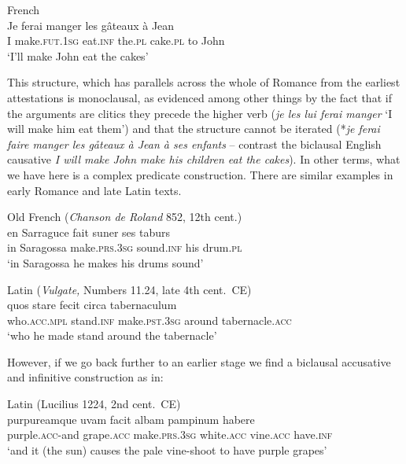 \documentclass[output=paper,hidelinks]{langscibook}
\begin{document}
\ea%
   \label{ex:RRG:44}French\\
   \gll Je   ferai       manger  les   gâteaux   à   Jean\\
      I   make.\textsc{fut.1sg}   eat.\textsc{inf}  the.\textsc{pl}  cake.\textsc{pl}   to   John\\
   \glt `I'll make John eat the cakes'
   \z


This structure, which has parallels across the whole of Romance from the earliest attestations \citep{Vincent2016} is monoclausal, as evidenced among other things by the fact that if the arguments are clitics they precede the higher verb (\textit{je les lui ferai manger} `I will make him eat them') and that the structure cannot be iterated (*\textit{je ferai faire manger les gåteaux à Jean à ses enfants} – contrast the biclausal English causative \textit{I will make John make his children eat the cakes}). In other terms, what we have here is a complex predicate construction. There are similar examples in early Romance and late Latin texts.

\newpage
\ea%
   \label{ex:RRG:45} Old French (\textit{Chanson de Roland} 852, 12th cent.)\\
   \gll en Sarraguce  fait      suner    ses  taburs\\
    in  Saragossa  make.\textsc{prs.3sg}  sound.\textsc{inf}  his   drum.\textsc{pl}\\
   \glt `in Saragossa he makes his drums sound'
   \z


\ea%
   \label{ex:RRG:46} Latin (\textit{Vulgate,} Numbers 11.24, late 4th cent.\ CE)\\
   \gll quos      stare    fecit       circa   tabernaculum\\
      who.\textsc{acc.mpl}  stand.\textsc{inf}  make.\textsc{pst.3sg}   around  tabernacle.\textsc{acc}\\
   \glt `who he made stand around the tabernacle'
   \z

However, if we go back further to an earlier stage we find a biclausal accusative and infinitive construction as in:

\ea%
   \label{ex:RRG:47} Latin (Lucilius 1224, 2nd cent.\ CE)\\
   \gll purpureamque   uvam    facit      albam   pampinum  habere\\
      purple.\textsc{acc-}and  grape.\textsc{acc}  make.\textsc{prs.3sg}  white.\textsc{acc}  vine.\textsc{acc}  have.\textsc{inf}\\
   \glt `and it (the sun) causes the pale vine-shoot to have purple grapes'
   \z
\end{document}
